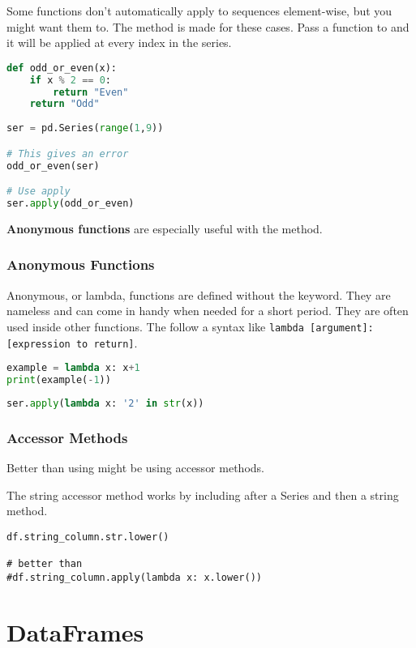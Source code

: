 Some functions don't automatically apply to sequences element-wise, but you might want them to. The  method is made for these cases. Pass a function to  and it will be applied at every index in the series.

\begin{lstlisting}[language = Python]
def odd_or_even(x):
    if x % 2 == 0:
        return "Even"
    return "Odd"
    
ser = pd.Series(range(1,9))

# This gives an error
odd_or_even(ser)

# Use apply
ser.apply(odd_or_even)
\end{lstlisting}

\textbf{Anonymous functions} are especially useful with the  method.

\subsubsection{Anonymous Functions}
Anonymous, or lambda, functions are defined without the  keyword. They are nameless and can come in handy when needed for a short period. They are often used inside other functions. The follow a syntax like \texttt{lambda [argument]: [expression to return]}.

\begin{lstlisting}[language = Python]
example = lambda x: x+1
print(example(-1))
\end{lstlisting}

\begin{lstlisting}[language = Python]
ser.apply(lambda x: '2' in str(x))
\end{lstlisting}

\subsubsection{Accessor Methods}
Better than using  might be using accessor methods. 

The string accessor method works by including  after a Series and then a string method. 

\begin{lstlisting}
df.string_column.str.lower()

# better than
#df.string_column.apply(lambda x: x.lower())
\end{lstlisting}

\section{DataFrames}

